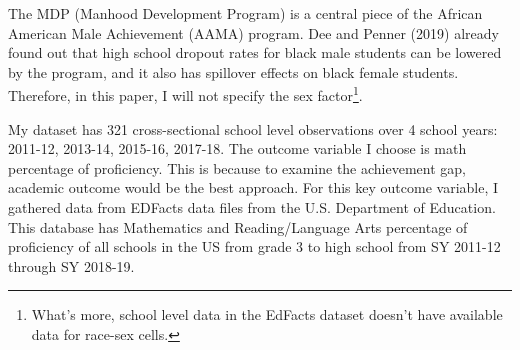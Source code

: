 
The MDP (Manhood Development Program) is a central piece of the African American Male Achievement (AAMA) program. Dee and Penner (2019) already found out that high school dropout rates for black male students can be lowered by the program, and it also has spillover effects on black female students. Therefore, in this paper, I will not specify the sex factor\footnote{What's more, school level data in the EdFacts dataset doesn't have available data for race-sex cells.}.

\noindent My dataset has 321 cross-sectional school level observations over 4 school years: 2011-12, 2013-14, 2015-16, 2017-18. The outcome variable I choose is math percentage of proficiency. This is because to examine the achievement gap, academic outcome would be the best approach. For this key outcome variable, I gathered data from EDFacts data files from the U.S. Department of Education. This database has Mathematics and Reading/Language Arts percentage of proficiency of all schools in the US from grade 3 to high school from SY 2011-12 through SY 2018-19. 

